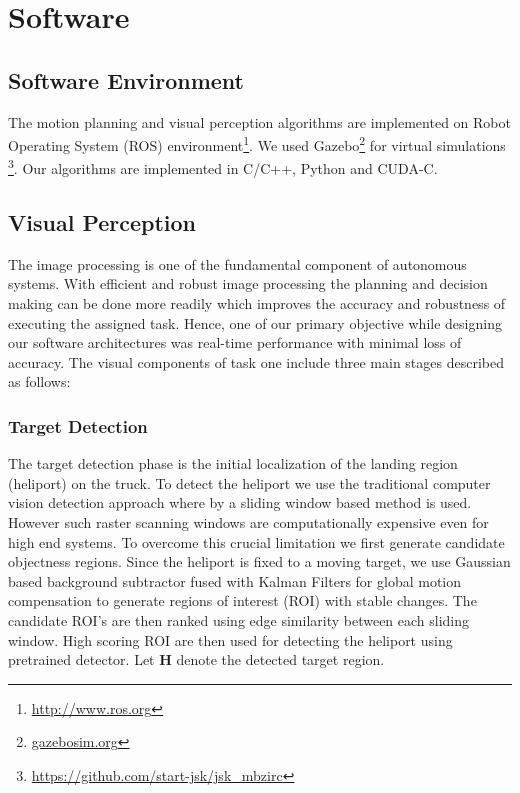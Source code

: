 \documentclass{standalone}
\begin{document}
\section{Software}


\subsection{Software Environment}
The motion planning and visual perception algorithms are implemented
on Robot Operating System (ROS) environment\footnote{\url{http://www.ros.org}}.
We used Gazebo\footnote{\url{gazebosim.org}} for virtual simulations
\footnote{\url{https://github.com/start-jsk/jsk_mbzirc}}. Our
algorithms are implemented in C/C++, Python and CUDA-C.


\subsection{Visual Perception}

The image processing is one of the fundamental component of autonomous
systems. With efficient and robust image processing the planning and
decision making can be done more readily which improves the accuracy
and robustness of executing the assigned task. Hence, one of our
primary objective while designing our software architectures was
real-time performance with minimal loss of accuracy. The visual
components of task one include three main stages described as follows:

\subsubsection{Target Detection}
The target detection phase is the initial localization of the landing
region (heliport) on the truck. To detect the heliport we use the
traditional computer vision detection approach where by a sliding
window based method is used. However such raster scanning windows are
computationally expensive even for high end systems. To overcome this
crucial limitation we first generate candidate objectness
regions. Since the heliport is fixed to a moving target, we use
Gaussian based background subtractor fused with Kalman Filters for 
global motion compensation to generate regions of interest
(ROI)  with stable changes. The candidate ROI's are then ranked using
edge similarity between each sliding window. High scoring ROI are then
used for detecting the heliport using pretrained detector. 
Let $\mathbf{H}$ denote the detected target region.
\end{document}

